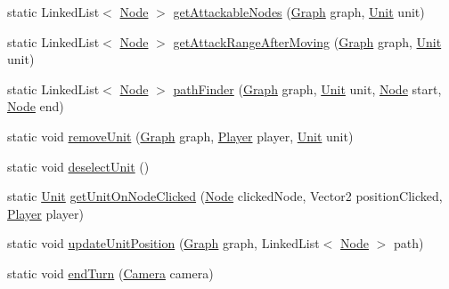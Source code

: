 \begin{DoxyCompactItemize}
\item 
static Linked\+List$<$ \hyperlink{class_model_1_1_map_module_1_1_node}{Node} $>$ \hyperlink{class_controller_1_1_game_function_ad6e9b27c164633455ec7433d3b7b6f50}{get\+Attackable\+Nodes} (\hyperlink{class_model_1_1_map_module_1_1_graph}{Graph} graph, \hyperlink{interface_model_1_1_unit_module_1_1_unit}{Unit} unit)
\item 
static Linked\+List$<$ \hyperlink{class_model_1_1_map_module_1_1_node}{Node} $>$ \hyperlink{class_controller_1_1_game_function_a6b9f4cc1fad812ac925b242d0debe4a5}{get\+Attack\+Range\+After\+Moving} (\hyperlink{class_model_1_1_map_module_1_1_graph}{Graph} graph, \hyperlink{interface_model_1_1_unit_module_1_1_unit}{Unit} unit)
\item 
static Linked\+List$<$ \hyperlink{class_model_1_1_map_module_1_1_node}{Node} $>$ \hyperlink{class_controller_1_1_game_function_a4d9123c98fec7919087096f35838acc8}{path\+Finder} (\hyperlink{class_model_1_1_map_module_1_1_graph}{Graph} graph, \hyperlink{interface_model_1_1_unit_module_1_1_unit}{Unit} unit, \hyperlink{class_model_1_1_map_module_1_1_node}{Node} start, \hyperlink{class_model_1_1_map_module_1_1_node}{Node} end)
\item 
static void \hyperlink{class_controller_1_1_game_function_a5d44bd8d957c6546f3ecd857433cde25}{remove\+Unit} (\hyperlink{class_model_1_1_map_module_1_1_graph}{Graph} graph, \hyperlink{class_model_1_1_player}{Player} player, \hyperlink{interface_model_1_1_unit_module_1_1_unit}{Unit} unit)
\item 
static void \hyperlink{class_controller_1_1_game_function_afc2f3baed432319b1e7bfc5dae69b634}{deselect\+Unit} ()
\item 
static \hyperlink{interface_model_1_1_unit_module_1_1_unit}{Unit} \hyperlink{class_controller_1_1_game_function_a35acdb9a83b042e26aab920de8b6f25d}{get\+Unit\+On\+Node\+Clicked} (\hyperlink{class_model_1_1_map_module_1_1_node}{Node} clicked\+Node, Vector2 position\+Clicked, \hyperlink{class_model_1_1_player}{Player} player)
\item 
static void \hyperlink{class_controller_1_1_game_function_a57eb3ddf64ac935212f80b2c82fa59df}{update\+Unit\+Position} (\hyperlink{class_model_1_1_map_module_1_1_graph}{Graph} graph, Linked\+List$<$ \hyperlink{class_model_1_1_map_module_1_1_node}{Node} $>$ path)
\item 
static void \hyperlink{class_controller_1_1_game_function_aae8d3490bc9fd6d22c3bf342fa80a7f1}{end\+Turn} (\hyperlink{class_view_1_1_camera}{Camera} camera)
\item 

\end{DoxyCompactItemize}
